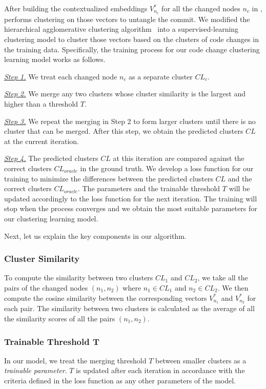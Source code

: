 After building the contextualized embeddings $V^{*}_{n_c}$ for all the
changed nodes $n_c$ in {\mvpdg}, {\tool} performs clustering on those
vectors to untangle the commit. We modified the hierarchical
agglomerative clustering algorithm~\cite{clustering} into a
supervised-learning clustering model to cluster those vectors based on
the clusters of code changes in the training data. Specifically, the
training process for our code change clustering learning model works as
follows.

{\em \underline{Step 1.}} We treat each changed node $n_c$ as
a separate cluster $CL_c$.

{\em \underline{Step 2.}} We merge any two clusters whose cluster
similarity is the largest and higher than a threshold $T$.

{\em \underline{Step 3.}} We repeat the merging in Step 2 to form
larger clusters until there is no cluster that can be merged. After
this step, we obtain the predicted clusters $CL$ at the current
iteration.

{\em \underline{Step 4.}} The predicted clusters $CL$ at this iteration
are compared against the correct clusters $CL_{oracle}$ in the ground
truth. We develop a loss function for our training to minimize the
differences between the predicted clusters $CL$ and the correct
clusters $CL_{oracle}$. The parameters and the trainable threshold $T$
will be updated accordingly to the loss function for the next
iteration. The training will stop when the process converges and we
obtain the most suitable parameters for our clustering learning model.

Next, let us explain the key components in our algorithm.

\subsubsection{{\bf Cluster Similarity}}
To compute the similarity between two clusters $CL_1$ and $CL_2$, we
take all the pairs of the changed nodes $(n_1,n_2)$ where $n_1 \in
CL_1$ and $n_2 \in CL_2$. We then compute the cosine similarity
between the corresponding vectors $V^{*}_{n_1}$ and $V^{*}_{n_2}$ for
each pair. The similarity between two clusters is calculated as the
average of all the similarity scores of all the pairs $(n_1,n_2)$.

\subsubsection{{\bf Trainable Threshold T}}
In our
model, we treat the merging threshold $T$ between smaller clusters as
a {\em trainable parameter}. $T$ is updated after each iteration in
accordance with the criteria defined in the loss function as any other
parameters of the model.

